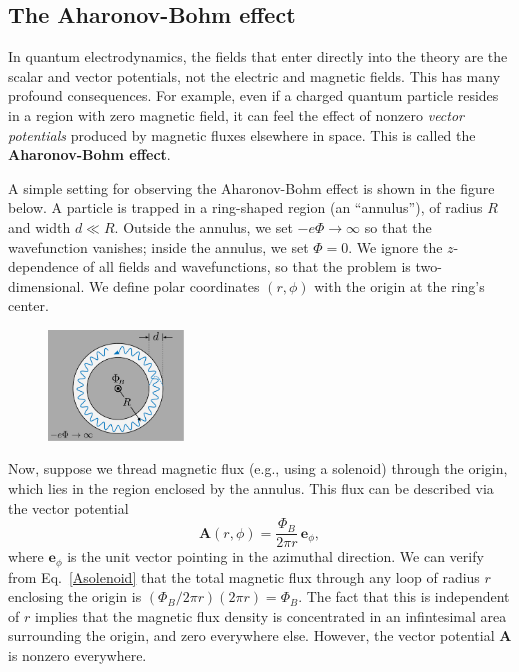 \documentclass[pra,12pt]{revtex4}
\begin{document}
\subsection{The Aharonov-Bohm effect}

In quantum electrodynamics, the fields that enter directly into the
theory are the scalar and vector potentials, not the electric and
magnetic fields.  This has many profound consequences.  For example,
even if a charged quantum particle resides in a region with zero
magnetic field, it can feel the effect of nonzero \textit{vector
  potentials} produced by magnetic fluxes elsewhere in space.  This is
called the \textbf{Aharonov-Bohm effect}.

A simple setting for observing the Aharonov-Bohm effect is shown in
the figure below.  A particle is trapped in a ring-shaped region (an
``annulus''), of radius $R$ and width $d \ll R$.  Outside the annulus,
we set $-e\Phi\rightarrow\infty$ so that the wavefunction vanishes;
inside the annulus, we set $\Phi = 0$.  We ignore the $z$-dependence
of all fields and wavefunctions, so that the problem is
two-dimensional.  We define polar coordinates $(r,\phi)$ with the
origin at the ring's center.

\begin{figure}[h]
  \centering\includegraphics[width=0.32\textwidth]{annulus}
\end{figure}

Now, suppose we thread magnetic flux (e.g., using a solenoid) through
the origin, which lies in the region enclosed by the annulus.  This
flux can be described via the vector potential
\begin{equation}
  \mathbf{A}(r,\phi) = \frac{\Phi_B}{2\pi r} \, \mathbf{e}_\phi,
  \label{Asolenoid}
\end{equation}
where $\mathbf{e}_\phi$ is the unit vector pointing in the azimuthal
direction.  We can verify from Eq.~\eqref{Asolenoid} that the total
magnetic flux through any loop of radius $r$ enclosing the origin is
$(\Phi_B/2\pi r)(2\pi r) = \Phi_B$.  The fact that this is independent
of $r$ implies that the magnetic flux density is concentrated in an
infintesimal area surrounding the origin, and zero everywhere
else. However, the vector potential $\mathbf{A}$ is nonzero
everywhere.
\end{document}
